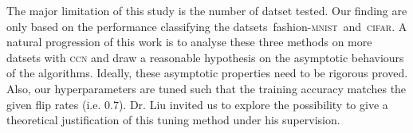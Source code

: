 \documentclass[12pt]{article} %
\newcommand{\mnist}{fashion-\textsc{mnist}}
\begin{document}
The major limitation of this study is the number of datset tested. Our finding are only based on the performance classifying the datsets~\mnist\ and~\textsc{cifar}. A natural progression of this work is to analyse these three methods on more datsets with \textsc{ccn} and draw a reasonable hypothesis on the asymptotic behaviours of the algorithms. Ideally, these asymptotic properties need to be rigorous proved. Also, our hyperparameters are tuned such that the training accuracy matches the given flip rates (i.e. $0.7$). Dr. Liu invited us to explore the possibility to give a theoretical justification of this tuning method under his supervision.
\label{headings}



\end{document}
